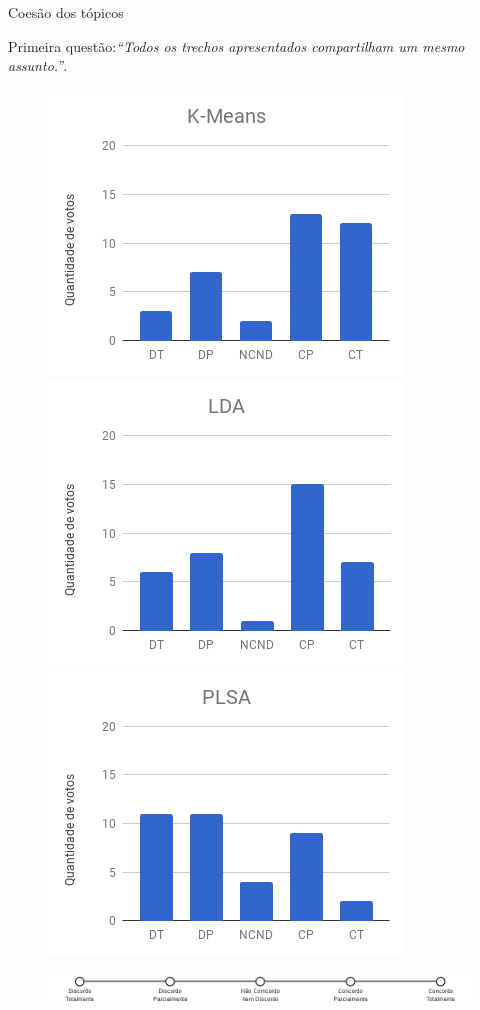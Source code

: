 \documentclass[xcolor=table]{beamer}
\begin{document}
\begin{frame}{Coesão dos tópicos}

	\center \small 
	Primeira questão:\textit{``Todos os trechos apresentados compartilham um mesmo assunto.''}. 

\begin{figure}[!h] \centering     %
		\includegraphics[width=.31\textwidth]{images/figuras-experimento/Q1-KMeans.png}
		\includegraphics[width=.31\textwidth]{images/figuras-experimento/Q1-LDA.png}
		\includegraphics[width=.31\textwidth]{images/figuras-experimento/Q1-PLSA.png}
	\label{fig:Q1}
\end{figure}


\begin{figure}[!h] \centering     %
	\includegraphics[width=.9\textwidth]{images/likert.png}
\end{figure}


\end{frame}
\end{document}
